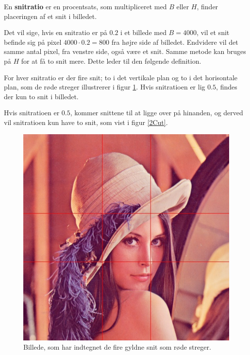{\begin{definition}
	En \textbf{snitratio} er en procentsats, som multipliceret med $B$ eller
	$H$, finder placeringen af et snit i billedet.
\end{definition}

Det vil sige, hvis en snitratio er på $0.2$ i et billede med $B =
4000$, vil et snit befinde sig på pixel $4000 \cdot 0.2 = 800$ fra højre side af
billedet. Endvidere vil det samme antal pixel, fra venstre side, også være et snit.
Samme metode kan bruges på $H$ for at få to snit mere. Dette leder til
den følgende definition.

\begin{definition}
	For hver snitratio er der fire snit; to i det vertikale plan og to i
	det horisontale plan, som de røde streger illustrerer i figur
    \ref{lenasnit2}. Hvis snitratioen er lig $0.5$, findes der kun to
    snit i billedet.
\end{definition}

Hvis snitratioen er $0.5$, kommer snittene til at ligge over på hinanden,
og derved vil snitratioen kun have to snit, som vist i figur \ref{2Cut}.

\begin{figure}[!h]
    \centering
    \includegraphics[scale=0.42,angle=0]{afsnit/vores_implementation/billeder/naiv_algoritme/Lenagolden}
    \caption[]{Billede, som har indtegnet de fire gyldne snit som røde
    streger.}
    \label{lenasnit2}
\end{figure}

}
